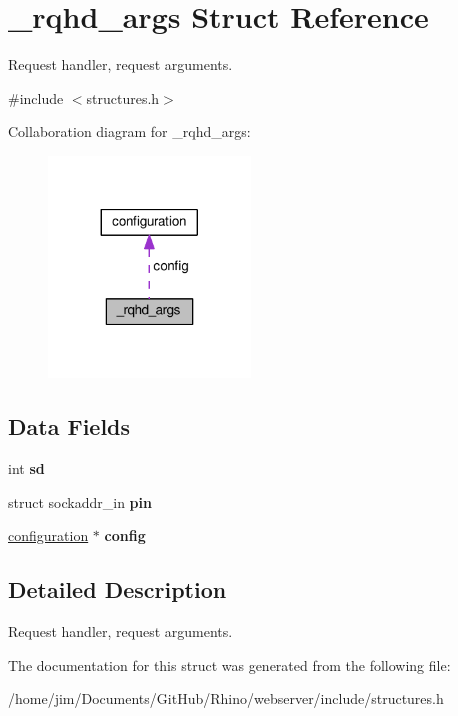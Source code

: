 \hypertarget{struct__rqhd__args}{}\section{\+\_\+rqhd\+\_\+args Struct Reference}
\label{struct__rqhd__args}


Request handler, request arguments.  




{\ttfamily \#include $<$structures.\+h$>$}



Collaboration diagram for \+\_\+rqhd\+\_\+args\+:
\nopagebreak
\begin{figure}[H]
\begin{center}
\leavevmode
\includegraphics[width=152pt]{struct__rqhd__args__coll__graph}
\end{center}
\end{figure}
\subsection*{Data Fields}
\begin{DoxyCompactItemize}
\item 
\hypertarget{struct__rqhd__args_a8a362ad4d44ca6a1cf7632552ad83906}{}int {\bfseries sd}\label{struct__rqhd__args_a8a362ad4d44ca6a1cf7632552ad83906}

\item 
\hypertarget{struct__rqhd__args_a22ab4fcf3d0f952989272fc389bb0f10}{}struct sockaddr\+\_\+in {\bfseries pin}\label{struct__rqhd__args_a22ab4fcf3d0f952989272fc389bb0f10}

\item 
\hypertarget{struct__rqhd__args_a0e9770e8c53d9c99ee6943f58ff11216}{}\hyperlink{structconfiguration}{configuration} $\ast$ {\bfseries config}\label{struct__rqhd__args_a0e9770e8c53d9c99ee6943f58ff11216}

\end{DoxyCompactItemize}


\subsection{Detailed Description}
Request handler, request arguments. 

The documentation for this struct was generated from the following file\+:\begin{DoxyCompactItemize}
\item 
/home/jim/\+Documents/\+Git\+Hub/\+Rhino/webserver/include/structures.\+h\end{DoxyCompactItemize}
